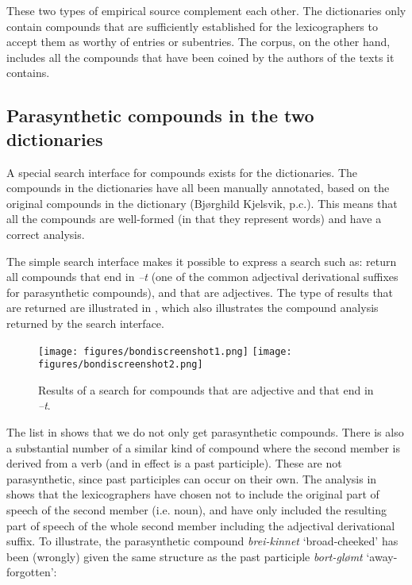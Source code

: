 \documentclass[output=paper]{LSP/langsci}
\begin{document}
These two types of empirical source complement each other. The dictionaries only contain compounds that are sufficiently established for the lexicographers to accept them as worthy of entries or subentries.  The corpus, on the other hand, includes all the compounds that have been coined by the authors of the texts it contains.

\subsection{Parasynthetic compounds in the two dictionaries}

A special search interface for compounds exists for the dictionaries. The compounds in the dictionaries have all been manually annotated, based on the original compounds in the dictionary (Bjørghild Kjelsvik, p.c.). This means that all the compounds are well-formed (in that they represent  words) and have a correct analysis.  

The simple search interface makes it possible to express a search such as:  return all compounds that end in \textit{–t} (one of the  common adjectival derivational suffixes for parasynthetic compounds), and that are adjectives.  The type of results that are returned are illustrated in , which also illustrates the compound analysis returned by the search interface. 

  
\begin{figure}
\texttt{[image: figures/bondiscreenshot1.png]}
\texttt{[image: figures/bondiscreenshot2.png]}
\caption{Results of a search for compounds that are adjective and that end in \textit{–t}.}
\label{fig:bondi:1}
\end{figure}



The list in  shows that we do not only get parasynthetic compounds. There is also a substantial number of a similar kind of compound where the second member is derived from a verb (and in effect is a past participle). These are not parasynthetic, since past participles can occur on their own. The analysis in  shows that the lexicographers have chosen not to include the original part of speech of the second member (i.e. noun), and have only included the resulting part of speech of the whole second member including the adjectival derivational suffix. To illustrate, the parasynthetic compound \textit{brei-kinnet} ‘broad-cheeked’ has been (wrongly) given the same structure as the past participle \textit{bort-glømt} ‘away-forgotten’:
\end{document}
